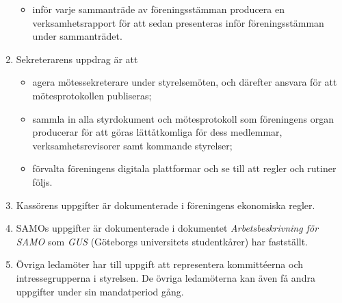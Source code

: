 \documentclass{dvd}
\begin{document}
\begin{enumerate}[label=\arabic* §, ref=\arabic*]
\begin{itemize}
		\item inför varje sammanträde av föreningsstämman producera en verksamhetsrapport för att sedan presenteras inför föreningsstämman under sammanträdet.
		\end{itemize}

		\item Sekreterarens uppdrag är att
		\begin{itemize}
		\item agera mötessekreterare under styrelsemöten, och därefter ansvara för att mötesprotokollen publiseras;

		\item sammla in alla styrdokument och mötesprotokoll som föreningens organ producerar för att göras lättåtkomliga för dess medlemmar, verksamhetsrevisorer samt kommande styrelser;

		\item förvalta föreningens digitala plattformar och se till att regler och rutiner följs.
		\end{itemize}

		\item Kassörens uppgifter är dokumenterade i föreningens ekonomiska regler.

		\item SAMOs uppgifter är dokumenterade i dokumentet \emph{Arbetsbeskrivning för SAMO} som \emph{GUS} (Göteborgs universitets studentkårer) har fastställt.

		\item Övriga ledamöter har till uppgift att representera kommittéerna och intressegrupperna i styrelsen.
		De övriga ledamöterna kan även få andra uppgifter under sin mandatperiod gång.
	\end{enumerate}
\end{document}
